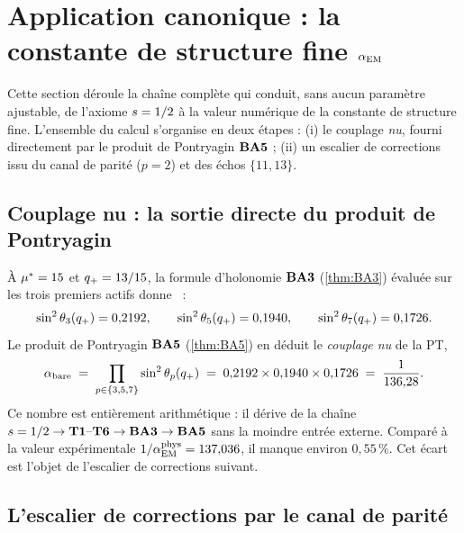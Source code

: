 \section{Application canonique : la constante de structure fine \texorpdfstring{$\alpha_{\rm EM}$}{α_EM}}
\label{sec:alphaem}

Cette section déroule la chaîne complète qui conduit, sans aucun paramètre ajustable, de l'axiome $s = 1/2$ à la valeur numérique de la constante de structure fine. L'ensemble du calcul s'organise en deux étapes : (i) le couplage \emph{nu}, fourni directement par le produit de Pontryagin $\textbf{BA5}$ ; (ii) un escalier de corrections issu du canal de parité ($p = 2$) et des échos $\{11, 13\}$.

\subsection{Couplage nu : la sortie directe du produit de Pontryagin}
\label{sec:alphaem:bare}

À $\mu^{*} = 15$ et $q_{+} = 13/15$, la formule d'holonomie $\textbf{BA3}$ (\ref{thm:BA3}) évaluée sur les trois premiers actifs donne~\cite[ch.~10]{PT_Monograph} :
\[
\sin^{2}\theta_{3}(q_{+}) = 0{,}2192, \qquad
\sin^{2}\theta_{5}(q_{+}) = 0{,}1940, \qquad
\sin^{2}\theta_{7}(q_{+}) = 0{,}1726.
\]
Le produit de Pontryagin $\textbf{BA5}$ (\ref{thm:BA5}) en déduit le \emph{couplage nu} de la PT,
\begin{equation}
\alpha_{\rm bare} \;=\; \prod_{p \in \{3,5,7\}} \sin^{2}\theta_{p}(q_{+})
\;=\; 0{,}2192 \times 0{,}1940 \times 0{,}1726
\;=\; \dfrac{1}{136{,}28}.
\label{eq:alpha_bare}
\end{equation}
Ce nombre est entièrement arithmétique : il dérive de la chaîne $s = 1/2 \to \textbf{T1}\text{--}\textbf{T6} \to \textbf{BA3} \to \textbf{BA5}$ sans la moindre entrée externe. Comparé à la valeur expérimentale $1/\alpha_{\rm EM}^{\rm phys} = 137{,}036$, il manque environ $0{,}55\,\%$. Cet écart est l'objet de l'escalier de corrections suivant.

\subsection{L'escalier de corrections par le canal de parité}
\label{sec:alphaem:corrections}

